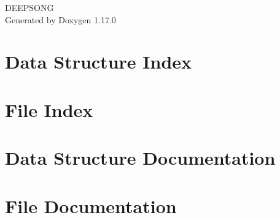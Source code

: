 \documentclass[twoside]{book}
\newcommand{\+}{\discretionary{\mbox{\scriptsize$\hookleftarrow$}}{}{}}
\newcommand{\clearemptydoublepage}{%
    \newpage{\pagestyle{empty}\cleardoublepage}%
  }
\begin{document}
  \raggedbottom
    \hypersetup{pageanchor=false,
                bookmarksnumbered=true,
                pdfencoding=unicode
               }
  \begin{titlepage}
  \vspace*{7cm}
  \begin{center}%
  {\Large DEEPSONG}\\
  \vspace*{1cm}
  {\large Generated by Doxygen 1.17.0}\\
  \end{center}
  \end{titlepage}
  \clearemptydoublepage
  \tableofcontents
  \clearemptydoublepage
  \hypersetup{pageanchor=true}
\chapter{Data Structure Index}

\chapter{File Index}

\chapter{Data Structure Documentation}

\chapter{File Documentation}





















  \backmatter
  \newpage
  \clearemptydoublepage
  \printindex
\end{document}
